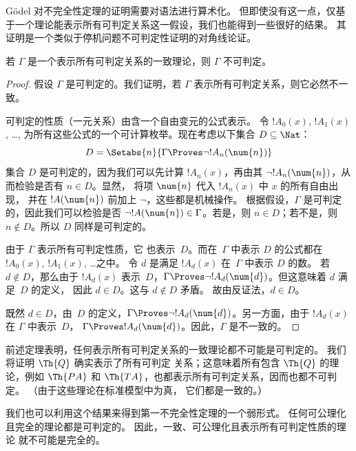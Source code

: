\documentclass[../../../include/open-logic-section]{subfiles}
\begin{document}


Gödel 对不完全性定理的证明需要对语法进行算术化。
但即使没有这一点，仅基于一个理论能表示所有可判定关系这一假设，我们也能得到一些很好的结果。
其证明是一个类似于停机问题不可判定性证明的对角线论证。

\begin{thm}
若 $\Gamma$ 是一个表示所有可判定关系的一致理论，则 $\Gamma$ 不可判定。
\end{thm}

\begin{proof}
假设 $\Gamma$ 是可判定的。我们证明，若 $\Gamma$
表示所有可判定关系，则它必然不一致。

可判定的性质（一元关系）由含一个自由变元的公式表示。
令 $!A_0(x)$, $!A_1(x)$, \dots,
为所有这些公式的一个可计算枚举。现在考虑以下集合 $D \subseteq \Nat$：
\[
D = \Setabs{n}{\Gamma \Proves \lnot !A_n(\num{n})}
\]
集合 $D$ 是可判定的，因为我们可以先计算 $!A_n(x)$，再由其 $\lnot !A_n(\num{n})$，从而检验是否有 $n \in D$。显然，
将项 $\num{n}$ 代入 $!A_n(x)$ 中 $x$ 的所有自由出现，
并在 $!A(\num{n})$ 前加上 $\lnot$，这些都是机械操作。
根据假设，$\Gamma$ 是可判定的，因此我们可以检验是否
$\lnot !A(\num{n}) \in \Gamma$。若是，则 $n \in D$；若不是，则
$n \notin D$。所以 $D$ 同样是可判定的。

由于 $\Gamma$ 表示所有可判定性质，它
也表示~$D$。而在~$\Gamma$ 中表示 $D$
的公式都在 $!A_0(x)$, $!A_1(x)$, \dots 之中。
令 $d$ 是满足 $!A_d(x)$ 在~$\Gamma$ 中表示 $D$ 的数。
若 $d \notin D$，那么由于 $!A_d(x)$ 表示~$D$，$\Gamma \Proves
\lnot !A_d(\num{d})$。但这意味着 $d$ 满足~$D$ 的定义，
因此 $d \in D$。这与 $d \notin D$ 矛盾。
故由反证法，$d \in D$。

既然 $d \in D$，由~$D$ 的定义，$\Gamma \Proves \lnot
!A_d(\num{d})$。另一方面，由于 $!A_d(x)$ 在 $\Gamma$ 中表示~$D$，
$\Gamma \Proves !A_d(\num{d})$。因此，$\Gamma$ 是不一致的。
\end{proof}

\begin{explain}
前述定理表明，任何表示所有可判定关系的一致理论都不可能是可判定的。
我们将证明 $\Th{Q}$ 确实表示了所有可判定
关系；这意味着所有包含 $\Th{Q}$ 的理论，例如
$\Th{PA}$ 和 $\Th{TA}$，也都表示所有可判定关系，因而也都不可判定。
（由于这些理论在标准模型中为真，
它们都是一致的。）

我们也可以利用这个结果来得到第一不完全性定理的一个弱形式。
任何可公理化且完全的理论都是可判定的。
因此，一致、可公理化且表示所有可判定性质的理论
就不可能是完全的。
\end{explain}
\end{document}
